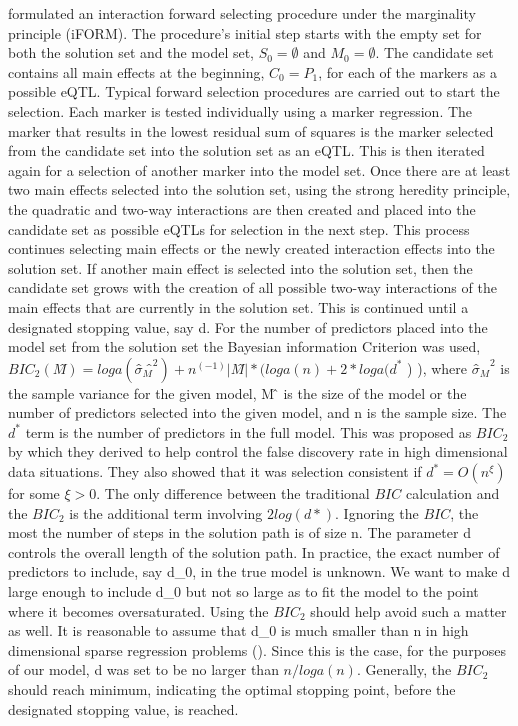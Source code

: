 \documentclass[11pt,]{book}
\theoremstyle{definition}
\theoremstyle{definition}
\theoremstyle{remark}
\begin{document}
\cite{hao2014interaction} formulated an interaction forward selecting
procedure under the marginality principle (iFORM). The procedure's
initial step starts with the empty set for both the solution set and the
model set, \(S_0=∅\) and \(M_0=∅\). The candidate set contains all main
effects at the beginning, \(C_0=P_1\), for each of the markers as a
possible eQTL. Typical forward selection procedures are carried out to
start the selection. Each marker is tested individually using a marker
regression. The marker that results in the lowest residual sum of
squares is the marker selected from the candidate set into the solution
set as an eQTL. This is then iterated again for a selection of another
marker into the model set. Once there are at least two main effects
selected into the solution set, using the strong heredity principle, the
quadratic and two-way interactions are then created and placed into the
candidate set as possible eQTLs for selection in the next step. This
process continues selecting main effects or the newly created
interaction effects into the solution set. If another main effect is
selected into the solution set, then the candidate set grows with the
creation of all possible two-way interactions of the main effects that
are currently in the solution set. This is continued until a designated
stopping value, say d. For the number of predictors placed into the
model set from the solution set the Bayesian information Criterion was
used, \(BIC_2 (M ̂ )=loga(σ ̂_M ̂^2 )+n^(-1) |M ̂ |*(loga(n)+2*loga(d^*\) )
), where \(σ ̂_M ̂^2\) is the sample variance for the given model,
\textbar{}M ̂ \textbar{} is the size of the model or the number of
predictors selected into the given model, and n is the sample size. The
\(d^*\) term is the number of predictors in the full model. This was
proposed as \(BIC_2\) by \cite{chen2008extended} which they derived to
help control the false discovery rate in high dimensional data
situations. They also showed that it was selection consistent if
\(d^*=O(n^ξ )\) for some \(ξ>0\). The only difference between the
traditional \(BIC\) calculation and the \(BIC_2\) is the additional term
involving \(2log(d*)\). Ignoring the \(BIC\), the most the number of
steps in the solution path is of size n. The parameter d controls the
overall length of the solution path. In practice, the exact number of
predictors to include, say d\_0, in the true model is unknown. We want
to make d large enough to include d\_0 but not so large as to fit the
model to the point where it becomes oversaturated. Using the \(BIC_2\)
should help avoid such a matter as well. It is reasonable to assume that
d\_0 is much smaller than n in high dimensional sparse regression
problems (\cite{fan2008sure}). Since this is the case, for the purposes
of our model, d was set to be no larger than \(n/loga(n)\). Generally,
the \(BIC_2\) should reach minimum, indicating the optimal stopping
point, before the designated stopping value, is reached.
\end{document}
